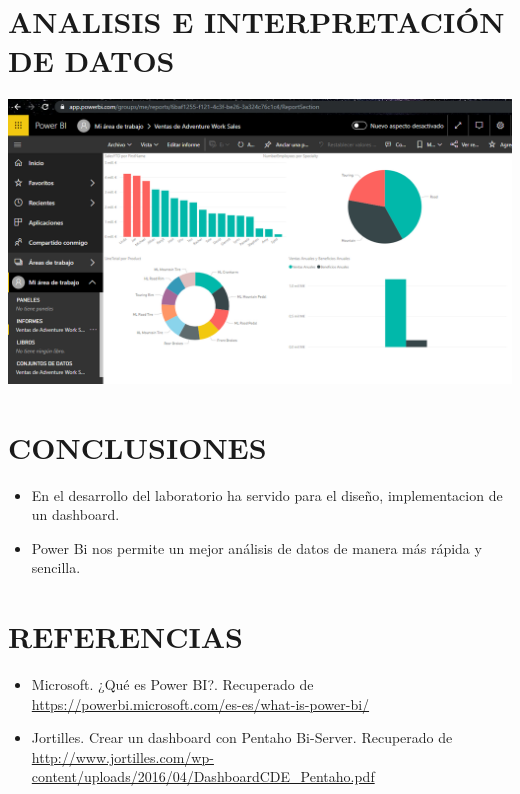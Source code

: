 \documentclass[12pt,letterpaper]{article}
\begin{document}
\section{ANALISIS E INTERPRETACIÓN DE DATOS}

	\begin{center}
	\includegraphics[width=18cm]{./Imagenes/img}
	\end{center}

\section{CONCLUSIONES}
\begin{itemize}
	\item En el desarrollo del laboratorio ha servido para el diseño, implementacion de un dashboard.
	\item Power Bi nos permite un mejor análisis de datos de manera más rápida y sencilla.
\end{itemize}
\section{REFERENCIAS}
\begin{itemize}
	\item Microsoft. ¿Qué es Power BI?. Recuperado de \url{https://powerbi.microsoft.com/es-es/what-is-power-bi/}
	\item Jortilles. Crear un dashboard con Pentaho Bi-Server. Recuperado de \url{http://www.jortilles.com/wp-content/uploads/2016/04/DashboardCDE_Pentaho.pdf}

\end{itemize}
\end{document}
